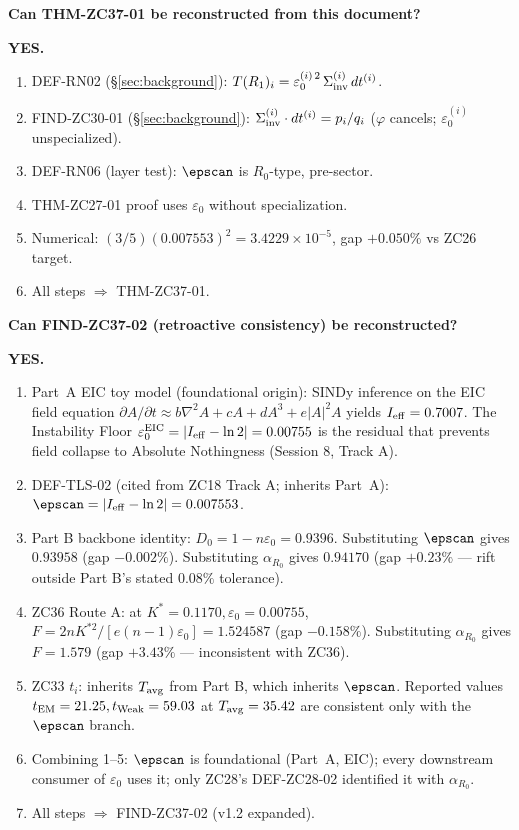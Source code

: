 \documentclass[12pt, a4paper]{article}
\begin{document}
\begin{formalbox}[title={Reconstruction Test (CUIP No-Loss)}]
\textbf{Can THM-ZC37-01 be reconstructed from this document?}

\textbf{YES.}
\begin{enumerate}[leftmargin=*, noitemsep]
  \item DEF-RN02 (\S\ref{sec:background}):
    $T(R_1)_i = \varepsilon_0^{(i)\,2}\,\Sigma_{\rm inv}^{(i)}\,dt^{(i)}$.
  \item FIND-ZC30-01 (\S\ref{sec:background}):
    $\Sigma_{\rm inv}^{(i)}\cdot dt^{(i)} = p_i/q_i$
    ($\varphi$ cancels; $\varepsilon_0^{(i)}$ unspecialized).
  \item DEF-RN06 (layer test): $\epscan$ is $R_0$-type,
    pre-sector.
  \item THM-ZC27-01 proof uses $\varepsilon_0$ without
    specialization.
  \item Numerical: $(3/5)(0.007553)^2 = 3.4229\times10^{-5}$,
    gap $+0.050\%$ vs ZC26 target.
  \item All steps $\Rightarrow$ THM-ZC37-01.
\end{enumerate}

\medskip
\textbf{Can FIND-ZC37-02 (retroactive consistency) be
reconstructed?}

\textbf{YES.}
\begin{enumerate}[leftmargin=*, noitemsep]
  \item Part~A EIC toy model (foundational origin):
    SINDy inference on the EIC field equation
    $\partial A/\partial t \approx b\nabla^2 A + cA + dA^3 + e|A|^2 A$
    yields $I_{\rm eff} = 0.7007$. The Instability Floor
    $\varepsilon_0^{\rm EIC} = |I_{\rm eff} - \ln 2|
    = 0.00755$ is the residual that prevents field collapse
    to Absolute Nothingness (Session 8, Track A).
  \item DEF-TLS-02 (cited from ZC18 Track A; inherits Part~A):
    $\epscan = |I_{\rm eff} - \ln 2| = 0.007553$.
  \item Part B backbone identity:
    $D_0 = 1 - n\varepsilon_0 = 0.9396$. Substituting
    $\epscan$ gives $0.93958$ (gap $-0.002\%$). Substituting
    $\alpha_{R_0}$ gives $0.94170$ (gap $+0.23\%$ ---
    rift outside Part B's stated $0.08\%$ tolerance).
  \item ZC36 Route A: at $K^* = 0.1170, \varepsilon_0 = 0.00755$,
    $F = 2nK^{*2}/[e(n-1)\varepsilon_0] = 1.524587$
    (gap $-0.158\%$). Substituting $\alpha_{R_0}$ gives
    $F = 1.579$ (gap $+3.43\%$ --- inconsistent with ZC36).
  \item ZC33 $t_i$: inherits $T_{\rm avg}$ from Part B,
    which inherits $\epscan$. Reported values $t_{\rm EM}
    = 21.25, t_{\rm Weak} = 59.03$ at $T_{\rm avg} = 35.42$
    are consistent only with the $\epscan$ branch.
  \item Combining 1--5: $\epscan$ is foundational
    (Part~A, EIC); every downstream consumer of
    $\varepsilon_0$ uses it; only ZC28's DEF-ZC28-02
    identified it with $\alpha_{R_0}$.
  \item All steps $\Rightarrow$ FIND-ZC37-02 (v1.2 expanded).
\end{enumerate}


\end{formalbox}
\end{document}
